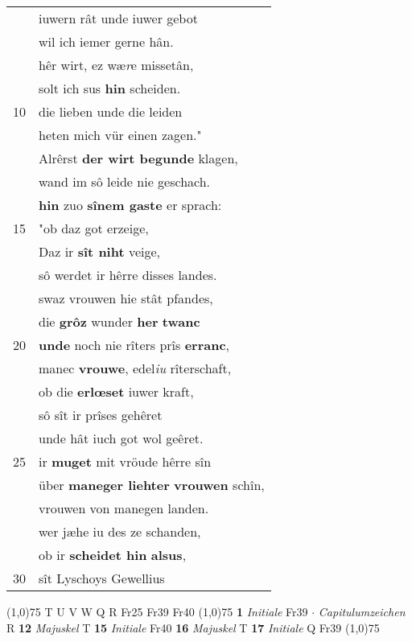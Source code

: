 \documentclass[8pt,a4paper,notitlepage]{article}
\begin{document}
\begin{table}[ht]
\begin{minipage}[t]{0.5\linewidth}
\begin{tabular}{rl}
 & iuwern rât unde iuwer gebot\\ 
 & wil ich iemer gerne hân.\\ 
 & hêr wirt, ez wæ\textit{r}e missetân,\\ 
 & solt ich sus \textbf{hin} scheiden.\\ 
10 & die lieben unde die leiden\\ 
 & heten mich vür einen zagen."\\ 
 & Alrêrst \textbf{der wirt begunde} klagen,\\ 
 & wand im sô leide nie geschach.\\ 
 & \textbf{hin} zuo \textbf{sînem gaste} er sprach:\\ 
15 & "ob daz got erzeige,\\ 
 & Daz ir \textbf{sît niht} veige,\\ 
 & sô werdet ir hêrre disses landes.\\ 
 & swaz vrouwen hie stât pfandes,\\ 
 & die \textbf{grôz} wunder \textbf{her} \textbf{twanc}\\ 
20 & \textbf{unde} noch nie rîters prîs \textbf{erranc},\\ 
 & manec \textbf{vrouwe}, edel\textit{iu} rîterschaft,\\ 
 & ob die \textbf{erlœset} iuwer kraft,\\ 
 & sô sît ir prîses gehêret\\ 
 & unde hât iuch got wol geêret.\\ 
25 & ir \textbf{muget} mit vröude hêrre sîn\\ 
 & über \textbf{maneger liehter} \textbf{vrouwen} schîn,\\ 
 & vrouwen von manegen landen.\\ 
 & wer jæhe iu des ze schanden,\\ 
 & ob ir \textbf{scheidet hin} \textbf{alsus},\\ 
30 & sît Lyschoys Gewellius\\ 
\end{tabular}
\scriptsize
\line(1,0){75} \newline
T U V W Q R Fr25 Fr39 Fr40 \newline
\line(1,0){75} \newline
\textbf{1} \textit{Initiale} Fr39   $\cdot$ \textit{Capitulumzeichen} R  \textbf{12} \textit{Majuskel} T  \textbf{15} \textit{Initiale} Fr40  \textbf{16} \textit{Majuskel} T  \textbf{17} \textit{Initiale} Q Fr39  \newline
\line(1,0){75} \newline

\end{minipage}
\end{table}
\end{document}
